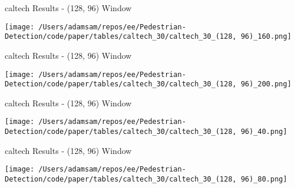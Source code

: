 \begin{table}
    \caption{caltech Results - (128, 96) Window}
    \texttt{[image: /Users/adamsam/repos/ee/Pedestrian-Detection/code/paper/tables/caltech\_30/caltech\_30\_(128, 96)\_160.png]}
    \label{tab:caltech_30_(128, 96)_160}
\end{table}

\begin{table}
    \caption{caltech Results - (128, 96) Window}
    \texttt{[image: /Users/adamsam/repos/ee/Pedestrian-Detection/code/paper/tables/caltech\_30/caltech\_30\_(128, 96)\_200.png]}
    \label{tab:caltech_30_(128, 96)_200}
\end{table}

\begin{table}
    \caption{caltech Results - (128, 96) Window}
    \texttt{[image: /Users/adamsam/repos/ee/Pedestrian-Detection/code/paper/tables/caltech\_30/caltech\_30\_(128, 96)\_40.png]}
    \label{tab:caltech_30_(128, 96)_40}
\end{table}

\begin{table}
    \caption{caltech Results - (128, 96) Window}
    \texttt{[image: /Users/adamsam/repos/ee/Pedestrian-Detection/code/paper/tables/caltech\_30/caltech\_30\_(128, 96)\_80.png]}
    \label{tab:caltech_30_(128, 96)_80}
\end{table}
